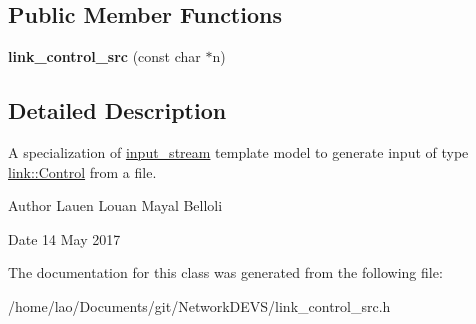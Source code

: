 \subsection*{Public Member Functions}
\begin{DoxyCompactItemize}
\item 
{\bfseries link\+\_\+control\+\_\+src} (const char $\ast$n)\hypertarget{classlink__control__src_a79f13f3b34d4d89a5c2b040a49468e60}{}\label{classlink__control__src_a79f13f3b34d4d89a5c2b040a49468e60}

\end{DoxyCompactItemize}


\subsection{Detailed Description}
A specialization of \hyperlink{classinput__stream}{input\+\_\+stream} template model to generate input of type \hyperlink{structlink_1_1Control}{link\+::\+Control} from a file. 

\begin{DoxyAuthor}{Author}
Lauen Louan Mayal Belloli 
\end{DoxyAuthor}
\begin{DoxyDate}{Date}
14 May 2017 
\end{DoxyDate}


The documentation for this class was generated from the following file\+:\begin{DoxyCompactItemize}
\item 
/home/lao/\+Documents/git/\+Network\+D\+E\+V\+S/link\+\_\+control\+\_\+src.\+h\end{DoxyCompactItemize}
